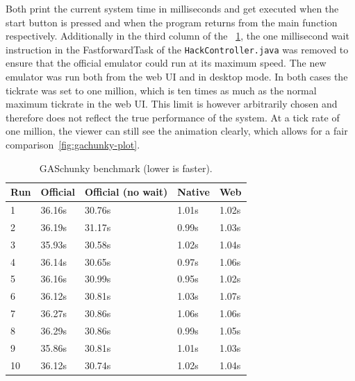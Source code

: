 Both print the current system time in milliseconds and get executed when the start button is pressed and when the program returns from the main function respectively.
Additionally in the third column of the ~\cref{table:gaschunky}, the one millisecond wait instruction in the FastforwardTask of the \verb+HackController.java+ was removed to ensure that the official emulator could run at its maximum speed.
The new emulator was run both from the web UI and in desktop mode.
In both cases the tickrate was set to one million, which is ten times as much as the normal maximum tickrate in the web UI.
This limit is however arbitrarily chosen and therefore does not reflect the true performance of the system.
At a tick rate of one million, the viewer can still see the animation clearly, which allows for a fair comparison~\ref{fig:gachunky-plot}.

\begin{table}[ht]
  \begin{center}
    \centering
    \begin{tabular}{@{}lllll@{}}
      \toprule
      Run & Official & Official (no wait) & Native &   Web \\ \midrule
      1   &   36.16s &             30.76s &  1.01s & 1.02s \\
      2   &   36.19s &             31.17s &  0.99s & 1.03s \\
      3   &   35.93s &             30.58s &  1.02s & 1.04s \\
      4   &   36.14s &             30.65s &  0.97s & 1.06s \\
      5   &   36.16s &             30.99s &  0.95s & 1.02s \\
      6   &   36.12s &             30.81s &  1.03s & 1.07s \\
      7   &   36.27s &             30.86s &  1.06s & 1.06s \\
      8   &   36.29s &             30.86s &  0.99s & 1.05s \\
      9   &   35.86s &             30.81s &  1.01s & 1.03s \\
      10  &   36.12s &             30.74s &  1.02s & 1.04s \\ \bottomrule
    \end{tabular}
    \caption{GASchunky benchmark (lower is faster).}%
    \label{table:gaschunky}
  \end{center}
\end{table}

